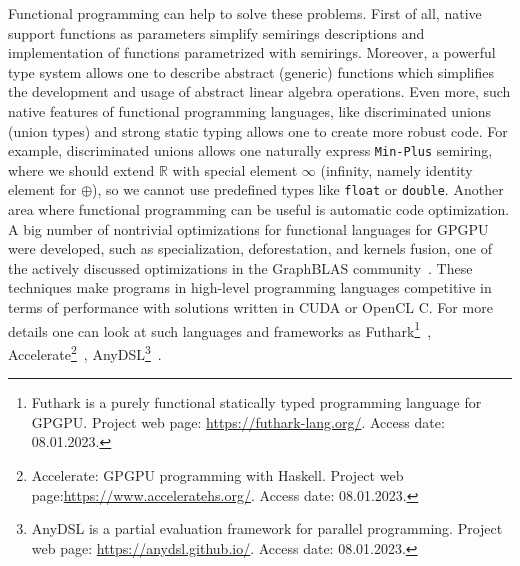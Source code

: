 Functional programming can help to solve these problems.
First of all, native support functions as parameters simplify semirings descriptions and implementation of functions parametrized with semirings.
Moreover, a powerful type system allows one to describe abstract (generic) functions which simplifies the development and usage of abstract linear algebra operations.
Even more, such native features of functional programming languages, like discriminated unions (union types) and strong static typing allows one to create more robust code.
For example, discriminated unions allows one naturally express \texttt{Min-Plus} semiring, where we should extend $\mathbb{R}$ with special element $\infty$ (infinity, namely identity element for $\oplus$), so we cannot use predefined types like \texttt{float} or \texttt{double}.
Another area where functional programming can be useful is automatic code optimization.
A big number of nontrivial optimizations for functional languages for GPGPU were developed, such as specialization, deforestation, and kernels fusion, one of the actively discussed optimizations in the GraphBLAS community~\cite{10.1145/3466795}.
These techniques make programs in high-level programming languages competitive in terms of performance with solutions written in CUDA or OpenCL C.
For more details one can look at such languages and frameworks as Futhark\footnote{Futhark is a purely functional statically typed programming language for GPGPU. Project web page: \url{https://futhark-lang.org/}. Access date: 08.01.2023.}~\cite{Henriksen:2017:FPF:3062341.3062354}, Accelerate\footnote{Accelerate: GPGPU programming with Haskell. Project web page:\url{https://www.acceleratehs.org/}. Access date: 08.01.2023.}~\cite{10.1145/2544174.2500595}, AnyDSL\footnote{AnyDSL is a partial evaluation framework for parallel programming. Project web page: \url{https://anydsl.github.io/}. Access date: 08.01.2023.}~\cite{10.1145/3276489}.

